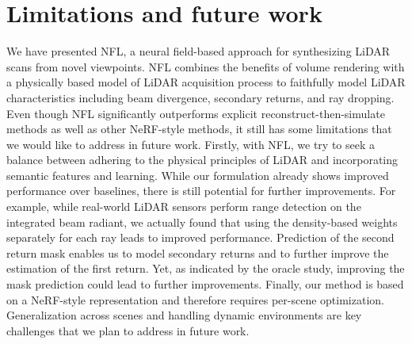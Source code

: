 \section{Limitations and future work}
\label{sec:conclusions}
We have presented NFL, a neural field-based approach for synthesizing LiDAR scans from novel viewpoints. NFL combines the benefits of volume rendering with a physically based model of LiDAR acquisition process to faithfully model LiDAR characteristics including beam divergence, secondary returns, and ray dropping. Even though NFL significantly outperforms explicit reconstruct-then-simulate methods as well as other NeRF-style methods, it still has some limitations that we would like to address in future work. Firstly, with NFL, we try to seek a balance between adhering to the physical principles of LiDAR and incorporating semantic features and learning. While our formulation already shows improved performance over baselines, there is still potential for further improvements. For example, while real-world LiDAR sensors perform range detection on the integrated beam radiant, we actually found that using the density-based weights separately for each ray leads to improved performance. Prediction of the second return mask enables us to model secondary returns and to further improve the estimation of the first return. Yet, as indicated by the oracle study, improving the mask prediction could lead to further improvements. Finally, our method is based on a NeRF-style representation and therefore requires per-scene optimization. Generalization across scenes and handling dynamic environments are key challenges that we plan to address in future work. 


